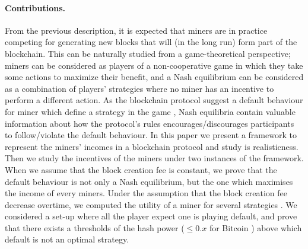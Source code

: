 \paragraph*{\bf Contributions.}  From the previous description, it is expected that miners are in practice competing for generating new blocks that will (in the long run) form part of the blockchain. This can be naturally studied from a game-theoretical perspective; miners can be considered as players of a non-cooperative game in which they take some actions to maximize their benefit, and a Nash equilibrium can be considered as a combination of players' strategies where no miner has an incentive to perform a different action. As the blockchain protocol suggest a default behaviour for miner which define a strategy in the game , Nash equilibria contain valuable information about how the protocol's rules encourages/discourages participants to follow/violate the default behaviour. 
In this paper we present a framework to represent the miners' incomes in a blockchain protocol and study is realisticness. Then we study the incentives of the miners under two instances of the framework. When we assume that the block creation fee is constant, we prove that the default behaviour is not only a Nash equilibrium, but the one which maximises the income of every miners. Under the assumption that the block creation fee decrease overtime, we computed the utility of a miner for several strategies . We considered a set-up where all the player expect one is playing default, and prove that there exists a thresholds of the hash power ($\leq 0.x$ for Bitcoin ) above which default is not an optimal strategy.

 
